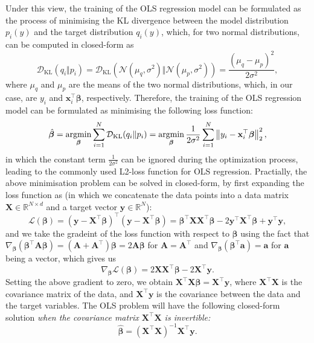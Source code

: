 Under this view, the training of the OLS regression model can be formulated as the process of minimising the KL divergence between the model distribution $p_i(y)$ and the target distribution $q_i(y)$, which, for two normal distributions, can be computed in closed-form as
\begin{equation}
\label{eq:ols_kl_div}
\mathcal{D}_{\mathrm{KL}}(q_i\Vert p_i) = \mathcal{D}_{\mathrm{KL}}(\mathcal{N}(\mu_q,\sigma^2)\Vert \mathcal{N}(\mu_p,\sigma^2)) = \frac{(\mu_q-\mu_p)^2}{2\sigma^2},
\end{equation}
where $\mu_q$ and $\mu_p$ are the means of the two normal distributions, which, in our case, are $y_i$ and $\bm{x}_i^{\top}\boldsymbol{\beta}$, respectively. Therefore, the training of the OLS regression model can be formulated as minimising the following loss function:
\begin{equation}
\label{eq:ols_loss}
\hat{\boldsymbol{\beta}} = \operatorname*{argmin}_{\boldsymbol{\beta}} \sum_{i=1}^{N} \mathcal{D}_{\mathrm{KL}}(q_i\Vert p_i) =  \operatorname*{argmin}_{\boldsymbol{\beta}}   \frac{1}{2\sigma^2}\sum_{i=1}^{N} \left\Vert y_i-\mathbf{x}_i^{\top}\boldsymbol{\beta}\right\Vert_2^2,
\end{equation}  
in which the constant term $\frac{1}{2\sigma^2}$ can be ignored during the optimization process, leading to the commonly used L2-loss function for OLS regression. Practially, the above minimisation problem can be solved in closed-form, by first expanding the loss function as (in which we concatenate the data points into a data matrix $\bm{X}\in \mathbb{R}^{N\times d}$ and a target vector $\bm{y}\in \mathbb{R}^N$):
\begin{equation}
    \label{eq:ols_loss_expand}
    \mathcal{L}(\boldsymbol{\beta})=(\bm{y}-\bm{X}^\top\boldsymbol{\beta})^\top (\bm{y}-\bm{X}^\top\boldsymbol{\beta}) = \boldsymbol{\beta}^\top \bm{X}\bm{X}^\top \boldsymbol{\beta} - 2\bm{y}^\top \bm{X}^\top \boldsymbol{\beta} + \bm{y}^\top \bm{y},
\end{equation}
and we take the gradeint of the loss function with respect to $\boldsymbol{\beta}$  using the fact that $\nabla_{\boldsymbol{\beta}} (\boldsymbol{\beta}^\top \bm{A} \boldsymbol{\beta}) = (\bm{A}+\bm{A}^\top)\boldsymbol{\beta}=2\bm{A}\boldsymbol{\beta}$ for $\bm{A}=\bm{A}^\top$ and $\nabla_{\boldsymbol{\beta}} (\boldsymbol{\beta}^\top\bm{a} ) = \bm{a}$ for $\bm{a}$ being a vector, which gives us 
\begin{equation}
    \label{eq:ols_loss_derivative}
    \nabla_{\boldsymbol{\beta}}\mathcal{L}(\boldsymbol{\beta}) = 2\bm{X}\bm{X}^\top \boldsymbol{\beta} - 2\bm{X}^\top\bm{y}.
\end{equation}
Setting the above gradient to zero, we obtain $\bm{X}^\top\bm{X}\boldsymbol{\beta}=\bm{X}^\top\bm{y}$, where $\bm{X}^\top\bm{X}$ is the covariance matrix of the data, and $\bm{X}^\top\bm{y}$ is the covariance between the data and the target variables. The OLS problem will have the following closed-form solution \emph{when the covariance matrix $\bm{X}^\top\bm{X}$ is invertible:}
\begin{equation}
    \label{eq:ols_solution}
    \hat{\boldsymbol{\beta}}=(\bm{X}^\top\bm{X})^{-1}\bm{X}^\top\bm{y}.
\end{equation}

